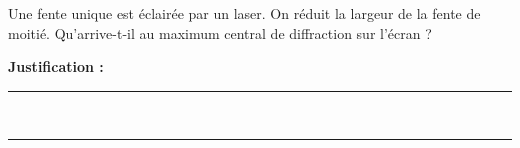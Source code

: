 Une fente unique est éclairée par un laser. On réduit la largeur de la fente de moitié. Qu'arrive-t-il au maximum central de diffraction sur l'écran ?

\choices

\noindent\textbf{Justification :} \hrulefill \\[2.5ex]
\rule{\linewidth}{0.4pt} \\[2.5ex]
\rule{\linewidth}{0.4pt}
\vfill
